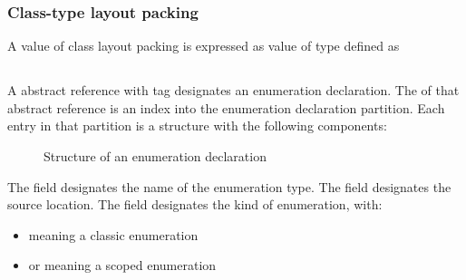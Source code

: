 \subsubsection{Class-type layout packing}
\label{sec:ifc-class-layout-packing}

A value of class layout packing is expressed as value of type  defined as 

\subsection{}
\label{sec:ifc:DeclSort:Enumeration}

A  abstract reference with tag  designates an enumeration declaration.
The  of that abstract reference is an index into the enumeration declaration partition.
Each entry in that partition is a structure with the following components:
%
\begin{figure}[H]
	\centering
	\caption{Structure of an enumeration declaration}
	\label{fig:ifc-enumeration-decl-structure}
\end{figure}
%
The  field designates the name of the enumeration type.
The  field designates the source location.
The  field designates the kind of enumeration, with:
\begin{itemize}
   \item {} meaning a classic enumeration
   \item {} or  meaning a scoped enumeration
\end{itemize}

